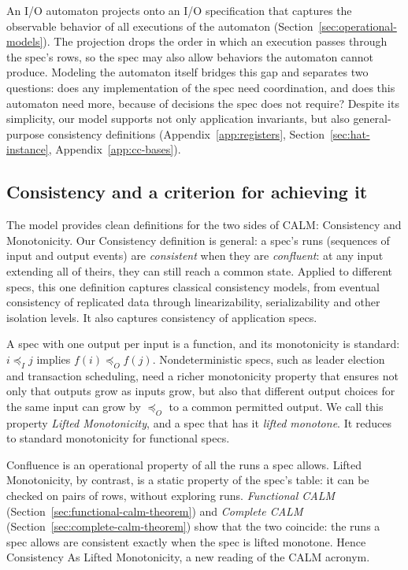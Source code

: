 \documentclass[sigconf]{cidr-2027}
\theoremstyle{remark}
\newcommand{\InputOrd}{\preceq_I}
\newcommand{\OutputOrd}{\preceq_O}
\newcommand{\spectype}[1][]{I/O specification#1\xspace}
\begin{document}
An I/O automaton projects onto an \spectype[] that captures the observable
behavior of all executions of the automaton
(Section~\ref{sec:operational-models}). The projection drops the order in
which an execution passes through the spec's rows, so the spec may also allow
behaviors the automaton cannot produce. Modeling the automaton itself bridges
this gap and separates two questions: does any implementation of the spec need
coordination, and does this automaton need more, because of decisions the spec
does not require? Despite its simplicity, our model supports not only application invariants,
but also general-purpose consistency definitions (Appendix~\ref{app:registers},
Section~\ref{sec:hat-instance}, Appendix~\ref{app:cc-bases}).

\subsection{Consistency and a criterion for achieving it}
\textcolor{reviewed}{The model provides clean definitions for the two sides of CALM: Consistency
and Monotonicity.} \textcolor{reviewed}{Our Consistency definition is general: a spec's runs
(sequences of input and output events) are \emph{consistent} when they are
\emph{confluent}: at any input extending all of theirs, they can still reach a
common state.} \textcolor{reviewed}{Applied to different specs,
this one definition captures classical consistency models, from eventual
consistency of replicated data through linearizability, serializability and
other isolation levels.} \textcolor{reviewed}{It also captures consistency of
application specs.}

\textcolor{reviewed}{A spec with one output per input is a function, and its monotonicity is standard: $i\InputOrd j$
implies $f(i)\OutputOrd f(j)$.} \textcolor{reviewed}{Nondeterministic specs, such as leader election
and transaction scheduling, need a richer monotonicity property that ensures
not only that outputs grow as inputs grow, but also that different output
choices for the same input can grow by $\OutputOrd$ to a common permitted
output.} \textcolor{reviewed}{We call this property \emph{Lifted Monotonicity}, and a spec that has
it \emph{lifted monotone}.} \textcolor{reviewed}{It reduces to standard monotonicity for functional specs.}

\textcolor{reviewed}{Confluence is an operational property of all the runs a spec allows.} \textcolor{reviewed}{Lifted Monotonicity,
by contrast, is a static property of the spec's table: it can be checked on
pairs of rows, without exploring runs.} \textcolor{reviewed}{\emph{Functional CALM}
(Section~\ref{sec:functional-calm-theorem}) and \emph{Complete CALM}
(Section~\ref{sec:complete-calm-theorem}) show that the two coincide: the runs a spec allows are consistent exactly when the spec is
lifted monotone.} \textcolor{reviewed}{Hence Consistency As Lifted Monotonicity, a new reading of the
CALM acronym.}
\end{document}
